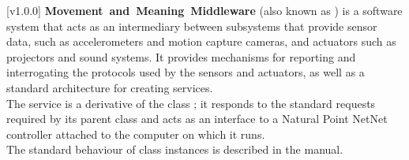 [v1.0.0]
\textbf{Movement~and~Meaning~Middleware} (also known as \mplusm) is a software system
that acts as an intermediary between subsystems that provide sensor data, such as
accelerometers and motion capture cameras, and actuators such as projectors and sound
systems.
It provides mechanisms for reporting and interrogating the protocols used by the sensors
and actuators, as well as a standard architecture for creating services.\\

The \NNI{} service is a derivative of the \mplusm{} class ;
it responds to the standard requests required by its parent class and acts as an interface
to a Natural Point NetNet controller attached to the computer on which it runs.\\

The standard behaviour of  class instances is described in
the \emph{\MMM} manual.
\primaryEnd{}

